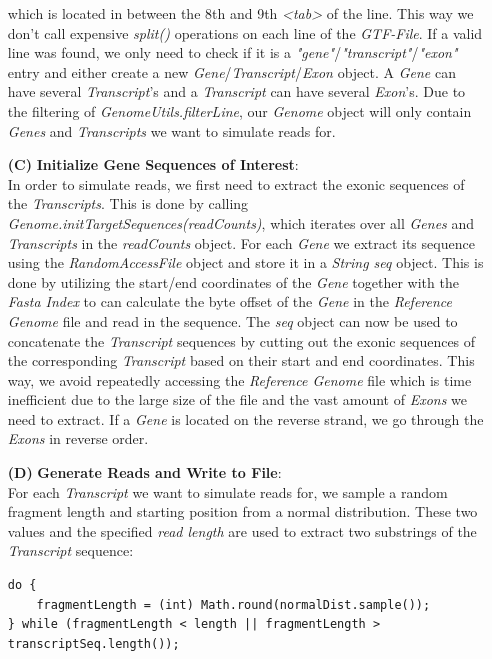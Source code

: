 \documentclass[12pt]{article}
\begin{document}
\begin{enumerate}
		which is located in between the 8th and 9th \textit{<tab>} of the line. This way we don't
		call expensive \textit{split()} operations on each line of the \textit{GTF-File}.
		If a valid line was found, we only need to check if it is a \textit{"gene"}/\textit{"transcript"}/\textit{"exon"} entry
		and either create a new \textit{Gene}/\textit{Transcript}/\textit{Exon} object. A \textit{Gene}
		can have several \textit{Transcript}'s and a \textit{Transcript} can have several \textit{Exon}'s.
		Due to the filtering of \textit{GenomeUtils.filterLine}, our \textit{Genome} object will only contain \textit{Genes} and
		\textit{Transcripts} we want to simulate reads for.
	\item[\textbf{(C)}] \textbf{Initialize Gene Sequences of Interest}:\\
		In order to simulate reads, we first need to extract the exonic sequences of the \textit{Transcripts}.
		This is done by calling \textit{Genome.initTargetSequences(readCounts)}, which iterates over all \textit{Genes} and
		\textit{Transcripts} in the \textit{readCounts} object. For each \textit{Gene} we extract its sequence using
		the \textit{RandomAccessFile} object and store it in a \textit{String seq} object. This is done by
		utilizing the start/end coordinates of the \textit{Gene} together with the \textit{Fasta Index}
		to can calculate the byte offset of the \textit{Gene} in the \textit{Reference Genome}
		file and read in the sequence.
		The \textit{seq} object can now be used to concatenate the \textit{Transcript} sequences by
		cutting out the exonic sequences of the corresponding \textit{Transcript} based on their
		start and end coordinates.
		This way, we avoid repeatedly accessing the \textit{Reference Genome} file which
		is time inefficient due to the large size of the file and the vast amount of \textit{Exons} we need to extract.
		If a \textit{Gene} is located on the reverse strand, we go through the \textit{Exons} in reverse order.
	\item[\textbf{(D)}] \textbf{Generate Reads and Write to File}:\\
		For each \textit{Transcript} we want to simulate reads for, we sample a random fragment length and starting position from a normal distribution.
		These two values and the specified \textit{read length} are used to extract two substrings of the \textit{Transcript} sequence:
		\begin{verbatim}
do {
    fragmentLength = (int) Math.round(normalDist.sample());
} while (fragmentLength < length || fragmentLength > transcriptSeq.length());

\end{verbatim}
\end{enumerate}
\end{document}
